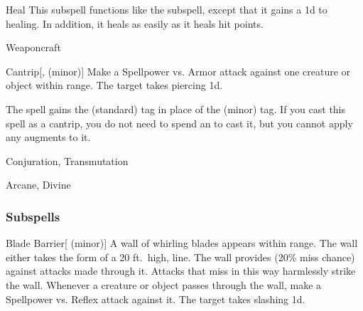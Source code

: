 \begin{ability}[\nth{6}]{Heal}
This subspell functions like the  subspell, except that it gains a \plus1d  to healing.
In addition, it heals  as easily as it heals hit points.
\end{ability}
\vspace{0.25em}

\newpage
\begin{spellsection}{Weaponcraft}

\begin{spellheader}
\end{spellheader}


\begin{ability}{Cantrip}[,  (minor)]
Make a Spellpower vs. Armor attack against one creature or object within \rngmed range.
\hit The target takes piercing  \minus1d.
\end{ability}



 The spell gains the  (standard) tag in place of the  (minor) tag. If you cast this spell as a cantrip,
you do not need to spend an  to cast it,
but you cannot apply any augments to it.


 Conjuration, Transmutation

 Arcane, Divine
\end{spellsection}


\subsubsection{Subspells}


\begin{ability}[\nth{1}]{Blade Barrier}[ (minor)]
A wall of whirling blades appears within \rngmed range.
The wall either takes the form of a 20 ft.\ high, \arealarge line.
The wall provides  (20\% miss chance) against attacks made through it.
Attacks that miss in this way harmlessly strike the wall.
Whenever a creature or object passes through the wall, make a Spellpower vs. Reflex attack against it.
\hit The target takes slashing  \minus1d.
\end{ability}
\vspace{0.25em}


